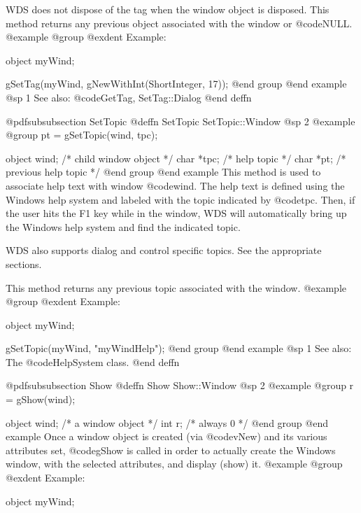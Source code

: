 WDS does not dispose of the tag when the window object is disposed.
This method returns any previous object associated with the window or
@code{NULL}.
@example
@group
@exdent Example:

object  myWind;

gSetTag(myWind, gNewWithInt(ShortInteger, 17));
@end group
@end example
@sp 1
See also:  @code{GetTag, SetTag::Dialog}
@end deffn












@pdfsubsubsection {SetTopic}
@deffn {SetTopic} SetTopic::Window
@sp 2
@example
@group
pt = gSetTopic(wind, tpc);

object  wind;   /*  child window object   */
char    *tpc;   /*  help topic            */
char    *pt;    /*  previous help topic   */
@end group
@end example
This method is used to associate help text with window @code{wind}.
The help text is defined using the Windows help system and labeled
with the topic indicated by @code{tpc}.  Then, if the user hits
the F1 key while in the window, WDS will automatically bring up
the Windows help system and find the indicated topic.

WDS also supports dialog and control specific topics.  See the appropriate
sections.

This method returns any previous topic associated with the window.
@example
@group
@exdent Example:

object  myWind;

gSetTopic(myWind, "myWindHelp");
@end group
@end example
@sp 1
See also:  The @code{HelpSystem} class.
@end deffn













@pdfsubsubsection {Show}
@deffn {Show} Show::Window
@sp 2
@example
@group
r = gShow(wind);

object  wind;   /*  a window object     */
int     r;      /*  always 0            */
@end group
@end example
Once a window object is created (via @code{vNew}) and its various attributes
set, @code{gShow} is called in order to actually create the Windows window,
with the selected attributes, and display (show) it.
@example
@group
@exdent Example:

object  myWind;


